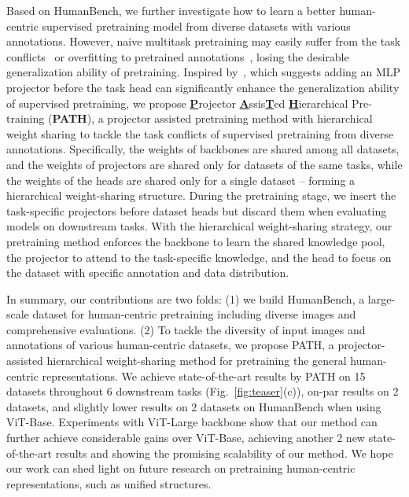 \documentclass[10pt,twocolumn,letterpaper]{article}
\begin{document}
Based on HumanBench, we further investigate how to learn a better human-centric supervised pretraining model from diverse datasets with various annotations. However, naive multitask pretraining may easily suffer from the task conflicts~\cite{liu2021conflict,yu2020gradient} or overfitting to pretrained annotations~\cite{sariyildiz2021concept,zhao2020makes}, losing the desirable generalization ability of pretraining. Inspired by~\cite{wang2022revisiting}, which suggests adding an MLP projector before the task head can significantly enhance the generalization ability of supervised pretraining, we propose \underline{\textbf{P}}rojector \underline{\textbf{A}}ssis\underline{\textbf{T}}ed \underline{\textbf{H}}ierarchical Pre-training (\textbf{PATH}), a projector assisted pretraining method with hierarchical weight sharing to tackle the task conflicts of supervised pretraining from diverse annotations. Specifically, the weights of backbones are shared among all datasets, and the weights of projectors are shared only for datasets of the same tasks, while the weights of the heads are shared only for a single dataset -- forming a hierarchical weight-sharing structure. 
During the pretraining stage, we insert the task-specific projectors before dataset heads but discard them when evaluating models on downstream tasks. With the hierarchical weight-sharing strategy, our pretraining method enforces the backbone to learn the shared knowledge pool, the projector to attend to the task-specific knowledge, and the head to focus on the dataset with specific annotation and data distribution.



In summary, our contributions are two folds: (1) we build HumanBench, a large-scale dataset for human-centric pretraining including diverse images and comprehensive evaluations. (2) To tackle the diversity of input images and annotations of various human-centric datasets, we propose PATH, a projector-assisted hierarchical weight-sharing method for pretraining the general human-centric representations. We achieve state-of-the-art results by PATH on 15 datasets throughout 6 downstream tasks (Fig.~\ref{fig:teaser}(c)), on-par results on 2 datasets, and slightly lower results on 2 datasets on HumanBench when using ViT-Base. Experiments with ViT-Large backbone show that our method can further achieve considerable gains over ViT-Base, achieving another 2 new state-of-the-art results and showing the promising scalability of our method. We hope our work can shed light on future research on pretraining human-centric representations, such as unified structures.
\end{document}
